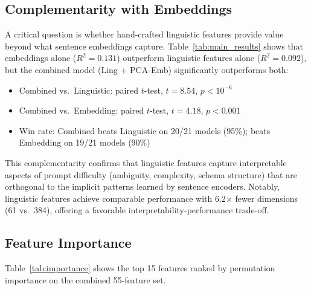\documentclass{article}
\begin{document}
\subsection{Complementarity with Embeddings}
\label{sec:embeddings}

A critical question is whether hand-crafted linguistic features provide value beyond what sentence embeddings capture. Table~\ref{tab:main_results} shows that embeddings alone ($R^2 = 0.131$) outperform linguistic features alone ($R^2 = 0.092$), but the combined model (Ling + PCA-Emb) significantly outperforms both:

\begin{itemize}[itemsep=1pt, parsep=0pt]
\item Combined vs.\ Linguistic: paired $t$-test, $t = 8.54$, $p < 10^{-6}$
\item Combined vs.\ Embedding: paired $t$-test, $t = 4.18$, $p < 0.001$
\item Win rate: Combined beats Linguistic on 20/21 models (95\%); beats Embedding on 19/21 models (90\%)
\end{itemize}

This complementarity confirms that linguistic features capture interpretable aspects of prompt difficulty (ambiguity, complexity, schema structure) that are orthogonal to the implicit patterns learned by sentence encoders. Notably, linguistic features achieve comparable performance with 6.2$\times$ fewer dimensions (61 vs.\ 384), offering a favorable interpretability-performance trade-off.


\subsection{Feature Importance}
\label{sec:importance}

Table~\ref{tab:importance} shows the top 15 features ranked by permutation importance on the combined 55-feature set.
\end{document}
